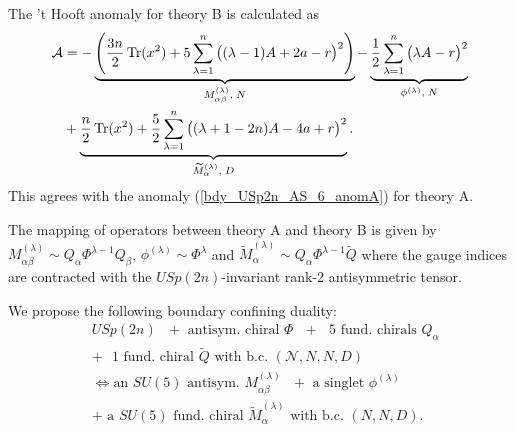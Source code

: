 \documentclass[12pt]{article}
\newcommand{\Acal}{\mathcal{A}}
\DeclareMathOperator*{\Tr}{{\rm Tr}}
\numberwithin{equation}{section}
\begin{document}
The 't Hooft anomaly for theory B is calculated as
\begin{align}
\label{bdy_USp2n_AS_6_anomB}
\Acal 
  &=  - \underbrace{\left( \frac{3n}{2} \Tr(x^2) + 5 \sum_{\lambda = 1}^n \big( (\lambda-1)A + 2a - r\big)^2 \right)}_{M_{\alpha \beta}^{(\lambda)}, \; N}
  - \underbrace{\frac{1}{2} \sum_{\lambda = 1}^n \big( \lambda A - r\big)^2}_{\phi^{(\lambda)}, \; N}
  \nonumber \\
  & + \underbrace{\frac{n}{2} \Tr(x^2) + \frac{5}{2} \sum_{\lambda = 1}^n \big( (\lambda + 1 -2n)A - 4a + r \big)^2}_{\widetilde{M}_{\alpha}^{(\lambda)}, \; D}. 
\end{align}
This agrees with the anomaly (\ref{bdy_USp2n_AS_6_anomA}) for theory A. 

The mapping of operators between theory A and theory B is given by
$M_{\alpha \beta}^{(\lambda)} \sim Q_{\alpha} \Phi^{\lambda-1} Q_{\beta}$, $\phi^{(\lambda)} \sim \Phi^\lambda$ and $\widetilde{M}_{\alpha}^{(\lambda)} \sim Q_{\alpha} \Phi^{\lambda-1} \widetilde{Q}$ where the gauge indices are contracted with the $USp(2n)$-invariant rank-$2$ antisymmetric tensor. 

We propose the following boundary confining duality: 
\begin{align}
\label{bdy_USp2n_AS_6_dual}
&\textrm{$USp(2n)$ $+$ antisym. chiral $\Phi$ $+$ $5$ fund. chirals $Q_{\alpha}$}
\nonumber\\
&\textrm{$+$ $1$ fund. chiral $\widetilde{Q}$ with b.c. $(\mathcal{N},N,N,D)$}
\nonumber\\
&\Leftrightarrow 
\textrm{
an $SU(5)$ antisym. $M_{\alpha\beta}^{(\lambda)}$ $+$ a singlet $\phi^{(\lambda)}$}
\nonumber\\
&\textrm{$+$ a $SU(5)$ fund. chiral $\widetilde{M}_{\alpha}^{(\lambda)}$ with b.c. $(N,N,D)$}. 
\end{align}
\end{document}
